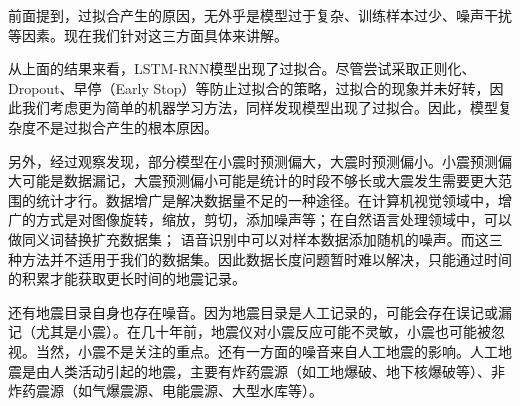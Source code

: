 前面提到，过拟合产生的原因，无外乎是模型过于复杂、训练样本过少、噪声干扰等因素。现在我们针对这三方面具体来讲解。

从上面的结果来看，LSTM-RNN模型出现了过拟合。尽管尝试采取正则化、Dropout、早停（Early Stop）等防止过拟合的策略，过拟合的现象并未好转，因此我们考虑更为简单的机器学习方法，同样发现模型出现了过拟合。因此，模型复杂度不是过拟合产生的根本原因。

另外，经过观察发现，部分模型在小震时预测偏大，大震时预测偏小。小震预测偏大可能是数据漏记，大震预测偏小可能是统计的时段不够长或大震发生需要更大范围的统计才行。数据增广是解决数据量不足的一种途径。在计算机视觉领域中，增广的方式是对图像旋转，缩放，剪切，添加噪声等；在自然语言处理领域中，可以做同义词替换扩充数据集；
语音识别中可以对样本数据添加随机的噪声。而这三种方法并不适用于我们的数据集。因此数据长度问题暂时难以解决，只能通过时间的积累才能获取更长时间的地震记录。

还有地震目录自身也存在噪音。因为地震目录是人工记录的，可能会存在误记或漏记（尤其是小震）。在几十年前，地震仪对小震反应可能不灵敏，小震也可能被忽视。当然，小震不是关注的重点。还有一方面的噪音来自人工地震的影响。人工地震是由人类活动引起的地震，主要有炸药震源（如工地爆破、地下核爆破等）、非炸药震源（如气爆震源、电能震源、大型水库等）。



  

